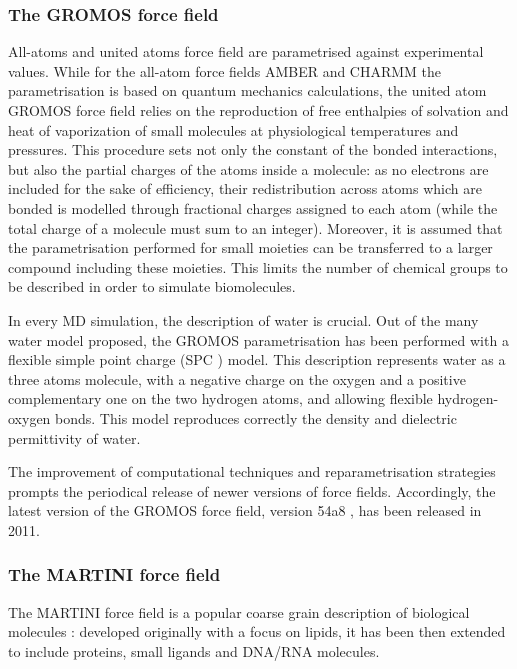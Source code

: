 \subsubsection{The GROMOS force field}
All-atoms and united atoms force field are parametrised against experimental values.
%
While for the all-atom force fields AMBER and CHARMM the parametrisation is based on quantum mechanics calculations, the united atom GROMOS force field relies on the reproduction of free enthalpies of solvation and heat of vaporization of small molecules at physiological temperatures and pressures.
%
This procedure sets not only the constant of the bonded interactions, but also the partial charges of the atoms inside a molecule: as no electrons are included for the sake of efficiency, their redistribution across atoms which are bonded is modelled through fractional charges assigned to each atom (while the total charge of a molecule must sum to an integer).
%
Moreover, it is assumed that the parametrisation performed for small moieties can be transferred to a larger compound including these moieties. This limits the number of chemical groups to be described in order to simulate biomolecules.

In every MD simulation, the description of water is crucial. Out of the many water model proposed, the GROMOS parametrisation has been performed with a flexible simple point charge (SPC \cite{Berendsen1981}) model. This description represents water as a three atoms molecule, with a negative charge on the oxygen and a positive complementary one on the two hydrogen atoms, and allowing flexible hydrogen-oxygen bonds. This model reproduces correctly the density and dielectric permittivity of water.

The improvement of computational techniques and reparametrisation strategies prompts the periodical release of newer versions of force fields. Accordingly, the latest version of the GROMOS force field, version 54a8 \cite{Schmid2011}, has been released in 2011.

\subsubsection{The MARTINI force field}

The MARTINI force field is a popular coarse grain description of biological molecules \cite{Marrink2007,Monticelli2008,DeJong2013}: developed originally with a focus on lipids, it has been then extended to include proteins, small ligands and DNA/RNA molecules.

